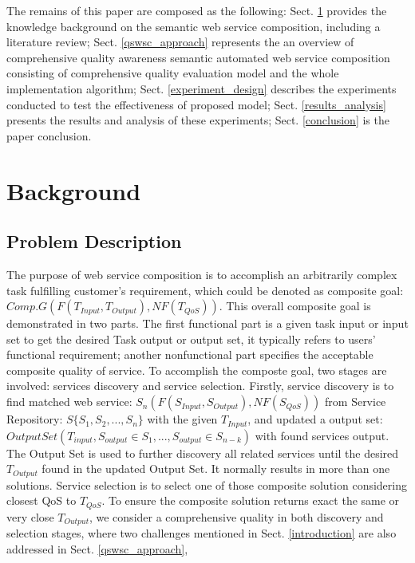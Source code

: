 \documentclass{llncs}
\begin{document}
The remains of this paper are composed as the following: Sect. \ref{background} provides the knowledge background on the semantic web service composition, including a literature review; Sect. \ref{qswsc_approach} represents the an overview of comprehensive quality awareness semantic automated web service composition consisting of comprehensive quality evaluation model and the whole implementation algorithm; Sect. \ref{experiment_design} describes the experiments conducted to test the effectiveness of proposed model; Sect. \ref{results_analysis} presents the results and analysis of these experiments; Sect. \ref{conclusion} is the paper conclusion.


\section{Background}\label{background}

\subsection{Problem Description}\label{problemDes}

The purpose of web service composition is to accomplish an arbitrarily complex task fulfilling customer's requirement, which could be denoted as composite goal: $Comp.G(F(T_{Input}, T_{Output}), NF(T_{QoS}))$. This overall composite goal is demonstrated in two parts. The first functional part is  a given task input or input set to get the desired Task output or output set, it typically refers to users' functional requirement; another nonfunctional part specifies the acceptable composite quality of service. To accomplish the composte goal, two stages are involved: services discovery and service selection. Firstly, service discovery is to find matched web service: $S_{n}(F(S_{Input}, S_{Output}), NF(S_{QoS}))$ from Service Repository: $S \{S_{1}, S_{2},..., S_{n} \}$ with the given $T_{Input}$, and updated a output set: $Output Set(T_{input}, S_{output} \in S_1,...,S_{output} \in S_{n-k})$ with found services output. The Output Set is used to further discovery all related services until the desired $T_{Output}$ found in the updated Output Set. It normally results in more than one solutions. Service selection is to select one of those composite solution considering closest QoS to $T_{QoS}$. To ensure the composite solution returns exact the same or very close $T_{Output}$, we consider a comprehensive quality in both discovery and selection stages, where two challenges mentioned in Sect. \ref{introduction} are also addressed in Sect. \ref{qswsc_approach},
\end{document}
